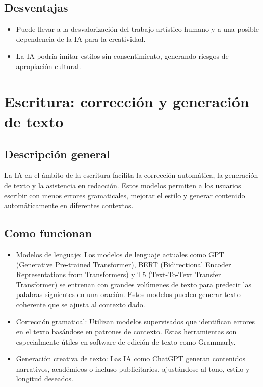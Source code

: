\documentclass[12pt]{article}
\begin{document}
\subsection{Desventajas}
\begin{itemize}
    \item Puede llevar a la desvalorización del trabajo artístico humano y a una posible dependencia de la IA para la creatividad.
    \item La IA podría imitar estilos sin consentimiento, generando riesgos de apropiación cultural.
\end{itemize}

\section{Escritura: corrección y generación de texto}

\subsection{Descripción general}
La IA en el ámbito de la escritura facilita la corrección automática, la generación de texto y la asistencia en redacción. 
Estos modelos permiten a los usuarios escribir con menos errores gramaticales, mejorar el estilo y generar contenido automáticamente 
en diferentes contextos.

\subsection{Como funcionan}
\begin{itemize}
    \item Modelos de lenguaje: 
    Los modelos de lenguaje actuales como GPT (Generative Pre-trained Transformer), BERT (Bidirectional Encoder Representations from Transformers)
    y T5 (Text-To-Text Transfer Transformer) se entrenan con grandes volúmenes de texto para predecir las palabras siguientes en una oración. 
    Estos modelos pueden generar texto coherente que se ajusta al contexto dado.
    \item Corrección gramatical:
    Utilizan modelos supervisados que identifican errores en el texto basándose en patrones de contexto. Estas herramientas son especialmente 
    útiles en software de edición de texto como Grammarly.
    \item Generación creativa de texto:
    Las IA como ChatGPT generan contenidos narrativos, académicos o incluso publicitarios, ajustándose al tono, estilo y longitud deseados.
\end{itemize}
\end{document}

